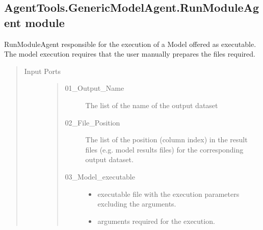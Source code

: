 \documentclass[letterpaper,10pt,english]{sphinxmanual}
\begin{document}
\subsection{AgentTools.GenericModelAgent.RunModuleAgent module}
\label{\detokenize{AgentTools.GenericModelAgent:module-AgentTools.GenericModelAgent.RunModuleAgent}}\label{\detokenize{AgentTools.GenericModelAgent:agenttools-genericmodelagent-runmoduleagent-module}}

\begin{fulllineitems}
\label{\detokenize{AgentTools.GenericModelAgent:AgentTools.GenericModelAgent.RunModuleAgent.RunModuleAgent}}
RunModuleAgent responsible for the execution of a Model offered as executable. 
The model execution requires that the user manually prepares the files required.
\begin{quote}\begin{description}
\item[{Input Ports}] \leavevmode\begin{quote}\begin{description}
\item[{01\_Output\_Name}] \leavevmode
The list of the name of the output dataset

\item[{02\_File\_Position}] \leavevmode
The list of the position (column index) in the result files (e.g. model results files) for the corresponding output dataset.

\item[{03\_Model\_executable}] \leavevmode\begin{itemize}
\item {} 
 executable file with the execution parameters excluding the arguments.

\item {} 
 arguments required for the execution.

\end{itemize}


\end{description}
\end{quote}
\end{description}
\end{quote}
\end{fulllineitems}
\end{document}

